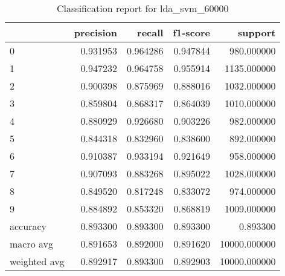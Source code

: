 \begin{table}[htb!]
\centering
\caption{Classification report for lda_svm_60000}
\label{tab:classification-report-lda_svm_60000}
\begin{tabular}{lrrrr}
\toprule
 & precision & recall & f1-score & support \\
\midrule
0 & 0.931953 & 0.964286 & 0.947844 & 980.000000 \\
1 & 0.947232 & 0.964758 & 0.955914 & 1135.000000 \\
2 & 0.900398 & 0.875969 & 0.888016 & 1032.000000 \\
3 & 0.859804 & 0.868317 & 0.864039 & 1010.000000 \\
4 & 0.880929 & 0.926680 & 0.903226 & 982.000000 \\
5 & 0.844318 & 0.832960 & 0.838600 & 892.000000 \\
6 & 0.910387 & 0.933194 & 0.921649 & 958.000000 \\
7 & 0.907093 & 0.883268 & 0.895022 & 1028.000000 \\
8 & 0.849520 & 0.817248 & 0.833072 & 974.000000 \\
9 & 0.884892 & 0.853320 & 0.868819 & 1009.000000 \\
accuracy & 0.893300 & 0.893300 & 0.893300 & 0.893300 \\
macro avg & 0.891653 & 0.892000 & 0.891620 & 10000.000000 \\
weighted avg & 0.892917 & 0.893300 & 0.892903 & 10000.000000 \\
\bottomrule
\end{tabular}
\end{table}
